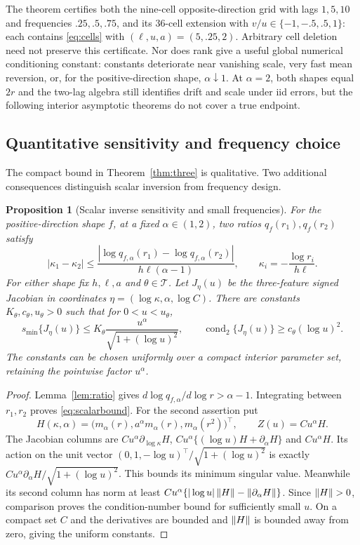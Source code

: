 \documentclass[11pt,a4paper]{article}
\newtheorem{proposition}[theorem]{Proposition}
\theoremstyle{remark}\newtheorem{remark}[theorem]{Remark}
\begin{document}
The theorem certifies both the nine-cell opposite-direction grid with lags $1,5,10$ and frequencies $.25,.5,.75$, and its 36-cell extension with $v/u\in\{-1,-.5,.5,1\}$: each contains \eqref{eq:cells} with $(\ell,u,a)=(5,.25,2)$. Arbitrary cell deletion need not preserve this certificate. Nor does rank give a useful global numerical conditioning constant: constants deteriorate near vanishing scale, very fast mean reversion, or, for the positive-direction shape, $\alpha\downarrow1$. At $\alpha=2$, both shapes equal $2r$ and the two-lag algebra still identifies drift and scale under iid errors, but the following interior asymptotic theorems do not cover a true endpoint.


\subsection{Quantitative sensitivity and frequency choice}\label{sec:conditioning}
The compact bound in Theorem~\ref{thm:three} is qualitative. Two additional consequences distinguish scalar inversion from frequency design.
\begin{proposition}[Scalar inverse sensitivity and small frequencies]\label{prop:frequency}
For the positive-direction shape $f$, at a fixed $\alpha\in(1,2)$, two ratios $q_f(r_1),q_f(r_2)$ satisfy
\begin{equation}\label{eq:scalarbound}
|\kappa_1-\kappa_2|\le
\frac{|\log q_{f,\alpha}(r_1)-\log q_{f,\alpha}(r_2)|}{h\ell(\alpha-1)},
\qquad \kappa_i=-\frac{\log r_i}{h\ell}.
\end{equation}
For either shape fix $h,\ell,a$ and $\theta\in\mathcal T$. Let $J_\eta(u)$ be the three-feature signed Jacobian in coordinates $\eta=(\log\kappa,\alpha,\log C)$. There are constants $K_\theta,c_\theta,u_\theta>0$ such that for $0<u<u_\theta$,
\begin{equation}\label{eq:smallfrequency}
s_{\min}\{J_\eta(u)\}\le K_\theta\frac{u^\alpha}{\sqrt{1+(\log u)^2}},
\qquad \operatorname{cond}_2\{J_\eta(u)\}\ge c_\theta(\log u)^2.
\end{equation}
The constants can be chosen uniformly over a compact interior parameter set, retaining the pointwise factor $u^\alpha$.
\end{proposition}
\begin{proof}
Lemma~\ref{lem:ratio} gives $d\log q_{f,\alpha}/d\log r>\alpha-1$. Integrating between $r_1,r_2$ proves \eqref{eq:scalarbound}.
For the second assertion put
\[
H(\kappa,\alpha)=\big(m_\alpha(r),a^\alpha m_\alpha(r),m_\alpha(r^2)\big)^\top,
\qquad Z(u)=Cu^\alpha H.
\]
The Jacobian columns are $Cu^\alpha\partial_{\log\kappa}H$, $Cu^\alpha\{(\log u)H+\partial_\alpha H\}$ and $Cu^\alpha H$. Its action on the unit vector $(0,1,-\log u)^\top/\sqrt{1+(\log u)^2}$ is exactly $Cu^\alpha\partial_\alpha H/\sqrt{1+(\log u)^2}$. This bounds its minimum singular value. Meanwhile its second column has norm at least $Cu^\alpha\{|\log u|\left\lVert H\right\rVert-\left\lVert\partial_\alpha H\right\rVert\}$. Since $\left\lVert H\right\rVert>0$, comparison proves the condition-number bound for sufficiently small $u$. On a compact set $C$ and the derivatives are bounded and $\left\lVert H\right\rVert$ is bounded away from zero, giving the uniform constants.
\end{proof}
\end{document}
